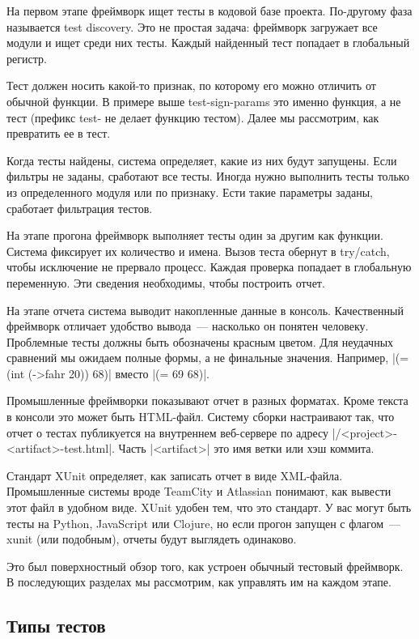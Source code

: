 На первом этапе фреймворк ищет тесты в кодовой базе проекта. По-другому фаза
называется test discovery. Это не простая задача: фреймворк загружает все модули
и ищет среди них тесты. Каждый найденный тест попадает в глобальный регистр.

Тест должен носить какой-то признак, по которому его можно отличить от обычной
функции. В примере выше test-sign-params это именно функция, а не тест (префикс
test- не делает функцию тестом). Далее мы рассмотрим, как превратить ее в тест.

Когда тесты найдены, система определяет, какие из них будут запущены. Если
фильтры не заданы, сработают все тесты. Иногда нужно выполнить тесты только из
определенного модуля или по признаку. Ести такие параметры заданы, сработает
фильтрация тестов.

На этапе прогона фреймворк выполняет тесты один за другим как функции. Система
фиксирует их количество и имена. Вызов теста обернут в try/catch, чтобы
исключение не прервало процесс. Каждая проверка попадает в глобальную
переменную. Эти сведения необходимы, чтобы построить отчет.

На этапе отчета система выводит накопленные данные в консоль. Качественный
фреймворк отличает удобство вывода~--- насколько он понятен человеку. Проблемные
тесты должны быть обозначены красным цветом. Для неудачных сравнений мы ожидаем
полные формы, а не финальные значения. Например, \spverb|(= (int (->fahr 20)) 68)|
вместо \spverb|(= 69 68)|.

Промышленные фреймворки показывают отчет в разных форматах. Кроме текста в
консоли это может быть HTML-файл. Систему сборки настраивают так, что отчет о
тестах публикуется на внутреннем веб-сервере по адресу
\spverb|/<project>-<artifact>-test.html|. Часть \spverb|<artifact>| это имя ветки или хэш
коммита.

Стандарт XUnit определяет, как записать отчет в виде XML-файла. Промышленные
системы вроде TeamCity и Atlassian понимают, как вывести этот файл в удобном
виде. XUnit удобен тем, что это стандарт. У вас могут быть тесты на Python,
JavaScript или Clojure, но если прогон запущен с флагом~---xunit (или подобным),
отчеты будут выглядеть одинаково.

Это был поверхностный обзор того, как устроен обычный тестовый фреймворк. В
последующих разделах мы рассмотрим, как управлять им на каждом этапе.

\subsection{Типы тестов}

